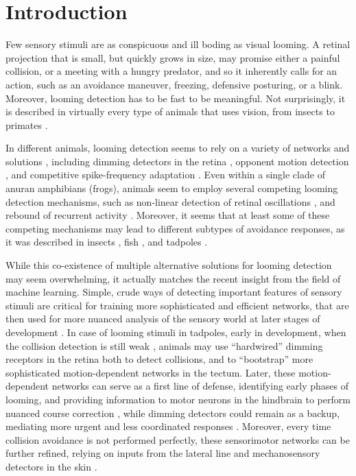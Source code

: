 \documentclass{article}
\begin{document}
\section*{Introduction}

Few sensory stimuli are as conspicuous and ill boding as visual looming. A retinal projection that is small, but quickly grows in size, may promise either a painful collision, or a meeting with a hungry predator, and so it inherently calls for an action, such as an avoidance maneuver, freezing, defensive posturing, or a blink. Moreover, looming detection has to be fast to be meaningful. Not surprisingly, it is described in virtually every type of animals that uses vision, from insects to primates \citep{Pereira2016}.

In different animals, looming detection seems to rely on a variety of networks and solutions \citep{frost2004review}, including dimming detectors in the retina \citep{ishikane2005,munch2009}, opponent motion detection \citep{klapoetke2017looming}, and competitive spike-frequency adaptation \citep{peron2009adaptation,fotowat2011multiplexing}. Even within a single clade of anuran amphibians (frogs), animals seem to employ several competing looming detection mechanisms, such as non-linear detection of retinal oscillations \citep{baranauskas2012}, and rebound of recurrent activity \citep{jang2016}. Moreover, it seems that at least some of these competing mechanisms may lead to different subtypes of avoidance responses, as it was described in insects \citep{card2008tradeoffs,chan2013avoidance}, fish \citep{burgess2007twoescapes,portugues2009behaviors,budick2000repertoire,temizer2015pathway,bhattacharyya2017assessment}, and tadpoles \citep{khakhalin2014}.

While this co-existence of multiple alternative solutions for looming detection may seem overwhelming, it actually matches the recent insight from the field of machine learning. Simple, crude ways of detecting important features of sensory stimuli are critical for training more sophisticated and efficient networks, that are then used for more nuanced analysis of the sensory world at later stages of development \citep{marblestone2016deeplearning}. In case of looming stimuli in tadpoles, early in development, when the collision detection is still weak \citep{dong2009}, animals may use “hardwired” dimming receptors in the retina \citep{baranauskas2012} both to detect collisions, and to “bootstrap” more sophisticated motion-dependent networks in the tectum. Later, these motion-dependent networks can serve as a first line of defense, identifying early phases of looming, and providing information to motor neurons in the hindbrain to perform nuanced course correction \citep{khakhalin2014,bhattacharyya2017assessment}, while dimming detectors could remain as a backup, mediating more urgent and less coordinated responses \citep{khakhalin2014}. Moreover, every time collision avoidance is not performed perfectly, these sensorimotor networks can be further refined, relying on inputs from the lateral line and mechanosensory detectors in the skin \citep{felch2016}.
\end{document}
